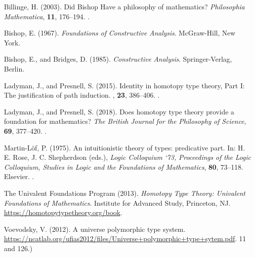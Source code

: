 \documentclass[11pt]{article}
\begin{document}
\begin{thebibliography}{}

Billinge, H. (2003).
\newblock Did Bishop Have a philosophy of mathematics?
\newblock \emph{Philosophia Mathematica}, \textbf{11}, 176--194.
\newblock {}.

Bishop, E. (1967).
\newblock \emph{Foundations of Constructive Analysis}.
\newblock McGraw-Hill, New York.

Bishop, E., and Bridges, D. (1985).
\newblock \emph{Constructive Analysis}.
\newblock Springer-Verlag, Berlin.

Ladyman, J., and Presnell, S. (2015).
\newblock Identity in homotopy type theory, Part I: The justification of
    path induction.
, \textbf{23}, 386--406.
\newblock {}.

Ladyman, J., and Presnell, S. (2018).
\newblock Does homotopy type theory provide a foundation for mathematics?
\newblock \emph{The British Journal for the Philosophy of Science},
    \textbf{69}, 377--420.
\newblock {}.

Martin-L\"{o}f, P. (1975).
\newblock An intuitionistic theory of types: predicative part.
\newblock In: H. E. Rose, J. C. Shepherdson (eds.),
    \emph{Logic Colloquium ‘73, Proceedings of the Logic Colloquium,
    Studies in Logic and the Foundations of Mathematics}, \textbf{80}, 73--118.
\newblock Elsevier.
\newblock {}.

The Univalent Foundations Program (2013).
\newblock \emph{Homotopy Type Theory: Univalent Foundations of Mathematics}.
\newblock Institute for Advanced Study, Princeton, NJ.
\newblock \url{https://homotopytypetheory.org/book}.

Voevodsky, V. (2012).
\newblock A universe polymorphic type system.
\newblock
\url{https://ncatlab.org/ufias2012/files/Universe+polymorphic+type+sytem.pdf}.
11 and 126.)

\end{thebibliography}
\end{document}
